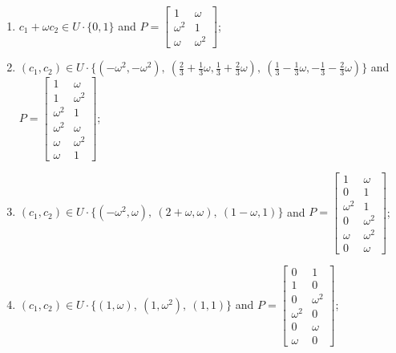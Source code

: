 
\begin{enumerate}
\item[(b1)] $c_1+\omega c_2\in U\cdot\{0,1\}$ and $P=\begin{bmatrix}1&\omega\\\omega^2&1\\\omega&\omega^2\end{bmatrix}$;
\item[(b2)] $(c_1,c_2)\in U\cdot\{(-\omega^2,-\omega^2),\allowbreak\ (\tfrac{2}{3}+\tfrac{1}{3}\omega,\tfrac{1}{3}+\tfrac{2}{3}\omega),\allowbreak\ (\tfrac{1}{3}-\tfrac{1}{3}\omega,-\tfrac{1}{3}-\tfrac{2}{3}\omega)\}$ and $P=\begin{bmatrix}1&\omega\\1&\omega^2\\\omega^2&1\\\omega^2&\omega\\\omega&\omega^2\\\omega&1\end{bmatrix}$;
\item[(b3)] $(c_1,c_2)\in U\cdot\{(-\omega^2,\omega),\allowbreak\ (2+\omega,\omega),\allowbreak\ (1-\omega,1)\}$ and $P=\begin{bmatrix}1&\omega\\0&1\\\omega^2&1\\0&\omega^2\\\omega&\omega^2\\0&\omega\end{bmatrix}$;
\item[(b4)] $(c_1,c_2)\in U\cdot\{(1,\omega),\allowbreak\ (1,\omega^2),\allowbreak\ (1,1)\}$ and $P=\begin{bmatrix}0&1\\1&0\\0&\omega^2\\\omega^2&0\\0&\omega\\\omega&0\end{bmatrix}$;
\end{enumerate}
